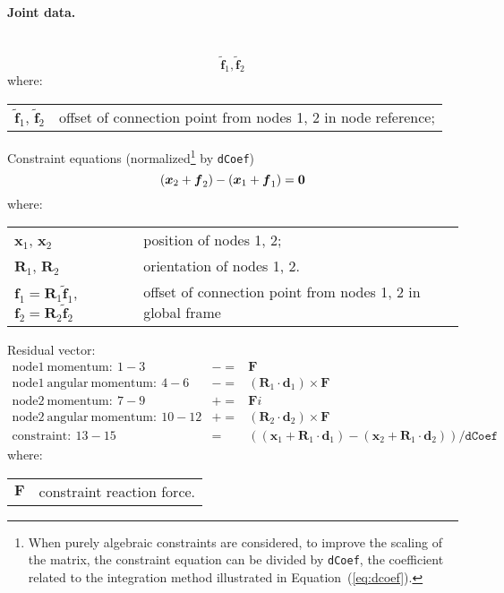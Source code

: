 \documentclass[10pt,dvips,fleqn,subeqn]{report}
\newcommand{\T}[1]{\boldsymbol{#1}}
\begin{document}
\paragraph{Joint data.} \
\begin{equation}
	\tilde{\T{f}}_1, \tilde{\T{f}}_2
\end{equation}
where:

\noindent
\begin{tabular}{ll}
$\tilde{\T{f}}_1$, $\tilde{\T{f}}_2$ & offset of connection point from nodes 1, 2 in node reference; \\
\end{tabular}

\noindent
Constraint equations (normalized\footnote{When purely algebraic
constraints are considered, to improve the scaling of the matrix,
the constraint equation can be divided by \texttt{dCoef},
the coefficient related to the integration method illustrated 
in Equation~(\ref{eq:dcoef}).
} by \texttt{dCoef})
\begin{equation}
	\plbr{\T{x}_2 + \T{f}_2} - \plbr{\T{x}_1 + \T{f}_1} = \T{0}
\end{equation}
where:

\noindent
\begin{tabular}{ll}
$\T{x}_1$, $\T{x}_2$ & position of nodes 1, 2; \\
$\T{R}_1$, $\T{R}_2$ & orientation of nodes 1, 2.\\
$\T{f}_1 = \T{R}_1 \tilde{\T{f}}_1$, $\T{f}_2 = \T{R}_2 \tilde{\T{f}}_2$ & offset of connection point from nodes 1, 2 in global frame
\end{tabular}

\noindent
Residual vector:
\begin{eqnarray*}
	\mathrm{node1\ momentum}:\ 1-3& -= & \T F \\
	\mathrm{node1\ angular\ momentum}:\ 4-6& -= & 
		(\T R_1\cdot \T d_1) \times \T F \\
	\mathrm{node2\ momentum}:\ 7-9& += & \T Fi \\
	\mathrm{node2\ angular\ momentum}:\ 10-12& += & 
		(\T R_2\cdot \T d_2) \times \T F \\
	\mathrm{constraint}:\ 13-15& = &  ((\T x_1+\T R_1\cdot \T d_1) - 
			(\T x_2+\T R_1\cdot \T d_2))/\texttt{dCoef}
\end{eqnarray*}
where:

\noindent
\begin{tabular}{ll}
$\T{F}$ & constraint reaction force.
\end{tabular}
\end{document}
